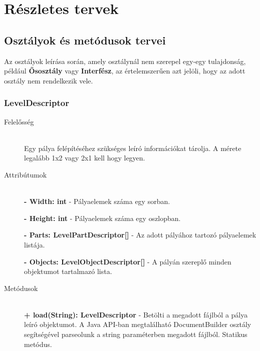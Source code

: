 


\setcounter{section}{7}




\fedlap

\section{Részletes tervek}

\subsection{Osztályok és metódusok tervei}

Az osztályok leírása során, amely osztálynál nem szerepel egy-egy tulajdonság, például \textbf{Ősosztály} vagy \textbf{Interfész}, az értelemszerűen azt jelöli, hogy az adott osztály nem rendelkezik vele.

\subsubsection{LevelDescriptor}
	\begin{description}
		\item[Felelősség] \hfill \\
		Egy pálya felépítéséhez szükséges leíró információkat tárolja. A mérete legalább 1x2 vagy 2x1 kell hogy legyen.
		
		\item[Attribútumok] \hfill \\
		\textbf{- Width: int} - Pályaelemek száma egy sorban.
		
		\textbf{- Height: int} - Pályaelemek száma egy oszlopban.
		
		\textbf{- Parts: LevelPartDescriptor[]} - Az adott pályához tartozó pályaelemek listája.
		
		\textbf{- Objects: LevelObjectDescriptor[]} - A pályán szereplő minden objektumot tartalmazó lista.
				
		\item[Metódusok] \hfill \\
		\textbf{+ load(String): LevelDescriptor} - Betölti a megadott fájlból a pálya leíró objektumot. A Java API-ban megtalálható DocumentBuilder osztály segítségével parseolunk a string paraméterben megadott fájlból. Statikus metódus.
						
	\end{description}
	
